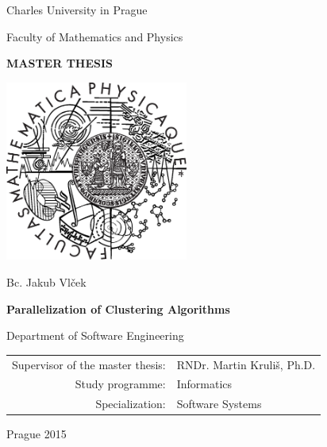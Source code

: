 \documentclass[12pt,a4paper]{report}
\begin{document}


\pagestyle{empty}
\begin{center}

\large

Charles University in Prague

\medskip

Faculty of Mathematics and Physics

\vfill

{\bf\Large MASTER THESIS}

\vfill

\centerline{\mbox{\includegraphics[width=60mm]{img/logo.eps}}}

\vfill
\vspace{5mm}

{\LARGE Bc. Jakub Vlček}

\vspace{15mm}

{\LARGE\bfseries Parallelization of Clustering Algorithms}

\vfill

Department of Software Engineering

\vfill

\begin{tabular}{rl}

Supervisor of the master thesis: & RNDr. Martin Kruliš, Ph.D. \\
\noalign{\vspace{2mm}}
Study programme: & Informatics \\
\noalign{\vspace{2mm}}
Specialization: & Software Systems \\
\end{tabular}

\vfill

Prague 2015

\end{center}
\end{document}
